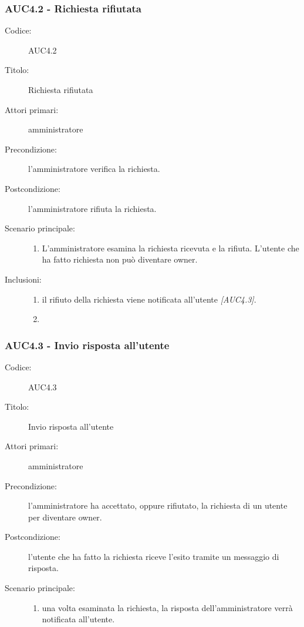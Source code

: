 \documentclass[../../../analisi-dei-requisiti.tex]{subfiles}
\begin{document}
\subsubsection{AUC4.2 - Richiesta rifiutata}%
\label{subsub:AUC4.2}

\begin{description}
  \item[Codice:] AUC4.2
  \item[Titolo:] Richiesta rifiutata
  \item[Attori primari:] amministratore
  \item[Precondizione:] l'amministratore verifica la richiesta.
  \item[Postcondizione:] l'amministratore rifiuta la richiesta.
  \item[Scenario principale:]
  \begin{enumerate}
    \item L'amministratore esamina la richiesta ricevuta e la rifiuta. L'utente che ha fatto richiesta non può diventare owner.
  \end{enumerate}
  \item[Inclusioni:]
  \begin{enumerate}
    \item il rifiuto della richiesta viene notificata all'utente \emph{[AUC4.3]}.
    \item
  \end{enumerate}
\end{description}

\subsubsection{AUC4.3 - Invio risposta all'utente}%
\label{subsub:AUC4.3}

\begin{description}
  \item[Codice:] AUC4.3
  \item[Titolo:] Invio risposta all'utente
  \item[Attori primari:] amministratore
  \item[Precondizione:] l'amministratore ha accettato, oppure rifiutato, la richiesta di un utente per diventare owner.
  \item[Postcondizione:] l'utente che ha fatto la richiesta riceve l'esito tramite un messaggio di risposta.
  \item[Scenario principale:]
  \begin{enumerate}
    \item una volta esaminata la richiesta, la risposta dell'amministratore verrà notificata all'utente.
  \end{enumerate}
\end{description}
\end{document}

